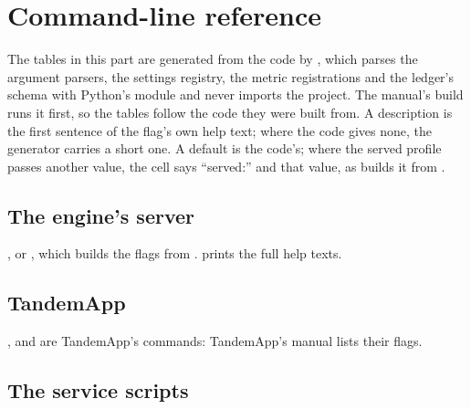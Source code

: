 \chapter{Command-line reference}\label{ch:ref-cli}

The tables in this part are generated from the code by , which parses the argument parsers, the settings registry, the metric registrations and the ledger's schema with Python's  module and never imports the project. The manual's build runs it first, so the tables follow the code they were built from. A description is the first sentence of the flag's own help text; where the code gives none, the generator carries a short one. A default is the code's; where the served profile passes another value, the cell says \enquote{served:} and that value, as  builds it from .

\section{The engine's server}

, or , which builds the flags from .  prints the full help texts.



\section{TandemApp}

,  and  are TandemApp's commands: TandemApp's manual lists their flags.

\section{The service scripts}

